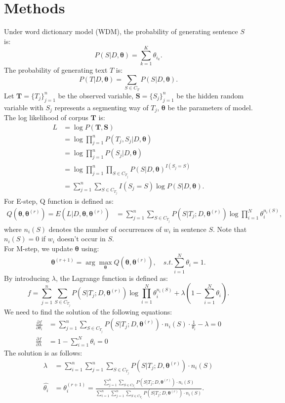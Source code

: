 \documentclass[12pt]{article}
\begin{document}
\section{Methods}
Under word dictionary model (WDM), the probability of generating sentence $S$ is:
$$ P(S|D, \bm{\theta}) = \sum_{k=1}^K \theta_{i_k}.$$
The probability of generating text $T$ is:
$$ P(T|D, \bm{\theta}) = \sum_{S \in C_T} P(S|D, \bm{\theta}). $$
Let $\bm{T} = \{T_j\}_{j=1}^n$ be the observed variable, $\bm{S} = \{S_j\}_{j=1}^n$ be the hidden random variable with $S_j$ represents a segmenting way of $T_j$, $\bm{\theta}$ be the parameters of model. The log likelihood of corpus $\bm{T}$ is:
\begin{align*}
L &= \log P(\bm{T}, \bm{S}) \\
&= \log \prod_{j=1}^n P(T_j, S_j | D, \bm{\theta}) \\
&= \log \prod_{j=1}^n P(S_j | D, \bm{\theta}) \\
&= \log \prod_{j=1}^n \prod_{S \in C_{T_j}} P(S|D, \bm{\theta})^{I(S_j = S)} \\
&= \sum_{j=1}^n \sum_{S \in C_{T_j}} I(S_j = S) \log P(S|D, \bm{\theta}).
\end{align*}
For E-step, Q function is defined as:
\begin{align*}
Q(\bm{\theta}, \bm{\theta}^{(r)}) = E(L|D, \bm{\theta}, \bm{\theta}^{(r)}) &= \sum_{j=1}^n \sum_{S \in C_{T_j}} P(S|T_j; D, \bm{\theta}^{(r)}) \log \prod_{i=1}^N \theta_i^{n_i(S)},
\end{align*}
where $n_i(S)$ denotes the number of occurrences of $w_i$ in sentence $S$. Note that $n_i(S) = 0$ if $w_i$ doesn't occur in $S$. \\
For M-step, we update $\bm{\theta}$ using:
$$ \bm{\theta}^{(r+1)} = \arg \max_{\bm{\theta}} Q(\bm{\theta}, \bm{\theta}^{(r)}), \quad s.t. \sum_{i=1}^N \theta_i = 1. $$
By introducing $\lambda$, the Lagrange function is defined as:
$$ f = \sum_{j=1}^n \sum_{S \in C_{T_j}} P(S|T_j; D, \bm{\theta}^{(r)}) \log \prod_{i=1}^N \theta_i^{n_i(S)} + \lambda (1-\sum_{i=1}^N \theta_i). $$
We need to find the solution of the following equations:
\begin{align*}
\frac{\partial f}{\partial \theta_i} &= \sum_{j=1}^n \sum_{S \in C_{T_j}} P(S|T_j; D, \bm{\theta}^{(r)}) \cdot n_i(S) \cdot \frac{1}{\theta_i} - \lambda = 0 \\
\frac{\partial f}{\partial \lambda} &= 1 - \sum_{i=1}^N \theta_i = 0
\end{align*}
The solution is as follows:
\begin{align*}
\lambda &= \sum_{i=1}^n \sum_{j=1}^n \sum_{S \in C_{T_j}} P(S|T_j; D, \bm{\theta}^{(r)}) \cdot n_i(S) \\
\hat{\theta_i} &= \theta_i^{(r+1)} = \frac{\sum_{j=1}^n \sum_{S \in C_{T_j}} P(S|T_j; D, \bm{\theta}^{(r)}) \cdot n_i(S)}{\sum_{i=1}^n \sum_{j=1}^n \sum_{S \in C_{T_j}} P(S|T_j; D, \bm{\theta}^{(r)}) \cdot n_i(S)}.
\end{align*}
\end{document}
